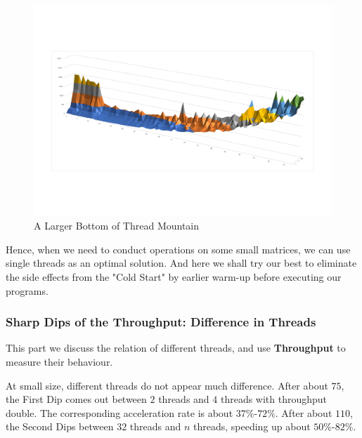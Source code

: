 \documentclass[12pt,a4paper]{article}
\begin{document}
\begin{figure}[H]
	\centering
	\includegraphics[scale= 0.75]{./fig/1_32_thread_0_90.pdf}
	\caption{A Larger Bottom of Thread Mountain}
	\label{fig::bottom2 of thread mountain}
\end{figure}

Hence, when we need to conduct operations on some small matrices, we can use single threads as an optimal solution. And here we shall try our best to eliminate the side effects from the "Cold Start" by earlier warm-up before executing our programs.

\subsubsection{Sharp Dips of the Throughput: Difference in Threads}\label{Part: Sharp Dips of Throughput}
This part we discuss the relation of different threads, and use \textbf{Throughput} to measure their behaviour.

At small size, different threads do not appear much difference. After about $75$, the First Dip comes out between $2$ threads and $4$ threads with throughput double. The corresponding acceleration rate is about $37\%$-$72\%$. After about $110$, the Second Dips between $32$ threads and $n$ threads, speeding up about $50\%$-$82\%$.
\end{document}

